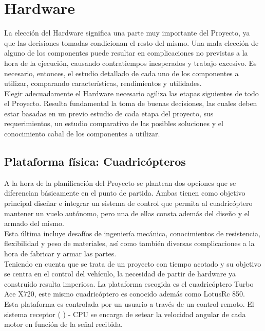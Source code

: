 \documentclass[main]{subfiles}
\begin{document}
\chapter{Hardware}
La elecci\'on del Hardware significa una parte muy importante del Proyecto, ya que las decisiones tomadas condicionan el resto del mismo. Una mala elecci\'on de alguno de los componentes puede resultar en complicaciones no previstas a la hora de la ejecuci\'on, causando contratiempos inesperados y trabajo excesivo. Es necesario, entonces, el estudio detallado de cada uno de los componentes a utilizar, comparando caracter\'isticas, rendimientos y utilidades.\\

Elegir adecuadamente el Hardware necesario agiliza las etapas siguientes de todo el Proyecto. Resulta fundamental la toma de buenas decisiones, las cuales deben estar basadas en un previo estudio de cada etapa del proyecto, sus requerimientos, un estudio comparativo de las posibles soluciones y el conocimiento cabal de los componentes a utilizar.\\

\section{Plataforma f\'isica: Cuadric\'opteros}


A la hora de la planificaci\'on del Proyecto se plantean dos opciones que se diferencian b\'asicamente en el punto de partida. Ambas tienen como objetivo principal dise\~nar e integrar un sistema de control que permita al cuadric\'optero mantener un vuelo aut\'onomo, pero una de ellas consta adem\'as del dise\~no y el armado del mismo. \\Esta \'ultima incluye desaf\'ios de ingenier\'ia mec\'anica, conocimientos de resistencia, flexibilidad y peso de materiales, as\'i como tambi\'en diversas complicaciones a la hora de fabricar y armar las partes. \\

Teniendo en cuenta que se trata de un proyecto con tiempo acotado y su objetivo se centra en el control del veh\'iculo, la necesidad de partir de hardware ya construido resulta imperiosa. La plataforma escogida es el cuadric\'optero Turbo Ace X720, este mismo cuadric\'optero es conocido adem\'as como LotusRc 850.\\

Esta plataforma es controlada por un usuario a trav\'es de un control remoto. El sistema receptor ( ) - CPU se encarga de setear la velocidad angular de cada motor en funci\'on de la se\~nal recibida. 
 
\end{document}
